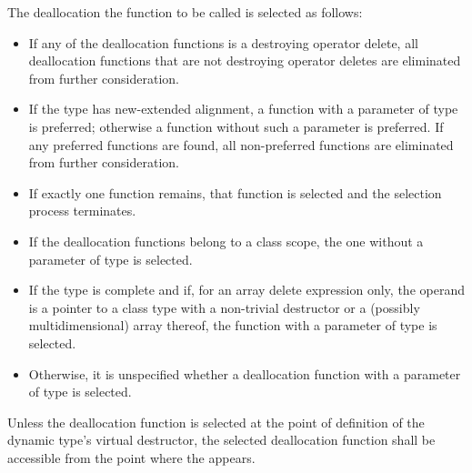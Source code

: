\pnum
The deallocation the function to be called is selected as follows:
\begin{itemize}
\item
If any of the deallocation functions is a destroying operator delete,
all deallocation functions that are not destroying operator deletes
are eliminated from further consideration.
\item
If the type has new-extended alignment,
a function with a parameter of type  is preferred;
otherwise a function without such a parameter is preferred.
If any preferred functions are found,
all non-preferred functions are eliminated from further consideration.
\item
If exactly one function remains,
that function is selected and the selection process terminates.
\item
If the deallocation functions belong to a class scope,
the one without a parameter of type  is selected.
\item
If the type is complete
and if, for an array delete expression only,
the operand is a pointer to a class type with a
non-trivial destructor or a (possibly multidimensional) array thereof,
the function with a parameter of type  is selected.
\item
Otherwise, it is unspecified
whether a deallocation function with a parameter of type 
is selected.
\end{itemize}
Unless the deallocation function is selected
at the point of definition of the dynamic type's virtual destructor,
the selected deallocation function shall be accessible
from the point where the  appears.

